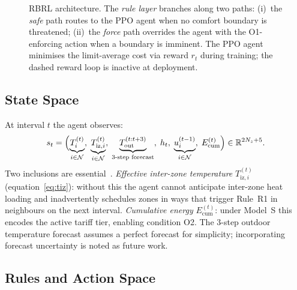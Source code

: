 \documentclass[12pt,a4paper]{article}
\let\oldsubsection\subsection
\renewcommand{\subsection}[1]{\FloatBarrier\oldsubsection{#1}}
\newcommand{\Rset}{\mathbb{R}}
\newcommand{\Tout}{T_{\mathrm{out}}}
\newcommand{\Tiz}[1]{T_{\mathrm{iz},#1}}
\begin{document}
\begin{figure}[!t]
\caption{RBRL architecture.
The \emph{rule layer} branches along two paths: (i)~the \emph{safe} path
routes to the PPO agent when no comfort boundary is threatened; (ii)~the
\emph{force} path overrides the agent with the O1-enforcing action when a
boundary is imminent.
The PPO agent minimises the limit-average cost via reward $r_t$ during
training; the dashed reward loop is inactive at deployment.}
\label{fig:framework}
\end{figure}

\subsection{State Space}
\label{subsec:state}

At interval $t$ the agent observes:
\begin{equation}
  s_t=\Bigl(
    \underbrace{T_i^{(t)}}_{i\in\mathcal{N}},\;
    \underbrace{\Tiz{i}^{(t)}}_{i\in\mathcal{N}},\;
    \underbrace{\Tout^{(t:t+3)}}_{\text{3-step forecast}},\;
    h_t,\;
    \underbrace{u_i^{(t-1)}}_{i\in\mathcal{N}},\;
    E_{\mathrm{cum}}^{(t)}
  \Bigr)\in\Rset^{2N_z+5}.
  \label{eq:state}
\end{equation}
Two inclusions are essential~\cite{Li2024MZ}.
\emph{Effective inter-zone temperature} $\Tiz{i}^{(t)}$
(equation~\eqref{eq:tiz}): without this the agent cannot anticipate
inter-zone heat loading and inadvertently schedules zones in ways that
trigger Rule~R1 in neighbours on the next interval.
\emph{Cumulative energy} $E_{\mathrm{cum}}^{(t)}$: under Model~S this
encodes the active tariff tier, enabling condition O2.
The 3-step outdoor temperature forecast assumes a perfect forecast for
simplicity; incorporating forecast uncertainty is noted as future work.

\subsection{Rules and Action Space}
\label{subsec:rules}
\end{document}
